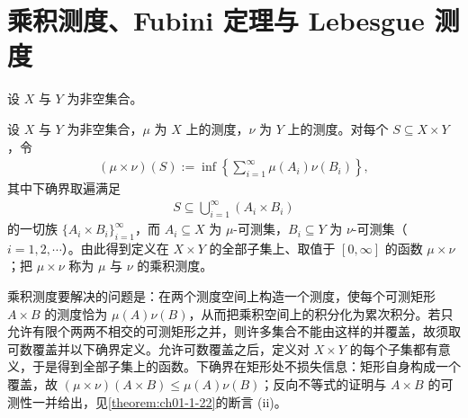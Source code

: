 \documentclass[../../main.tex]{subfiles}%
\begin{document}
\section{乘积测度、Fubini 定理与 Lebesgue 测度}\label{section:ch01-04}

设 $X$ 与 $Y$ 为非空集合。

\begin{definition}[乘积测度]\label{definition:ch01-1-16}
设 $X$ 与 $Y$ 为非空集合，$\mu$ 为 $X$ 上的测度，$\nu$ 为 $Y$ 上的测度。对每个 $S\subseteq X\times Y$，令
\begin{align*}
(\mu\times\nu)(S):=\inf\left\{\sum_{i=1}^{\infty}\mu(A_i)\nu(B_i)\right\},
\end{align*}
其中下确界取遍满足
\begin{align*}
S\subseteq\bigcup_{i=1}^{\infty}(A_i\times B_i)
\end{align*}
的一切族 $\{A_i\times B_i\}_{i=1}^{\infty}$，而 $A_i\subseteq X$ 为 $\mu$-可测集，$B_i\subseteq Y$ 为 $\nu$-可测集（$i=1,2,\cdots$）。由此得到定义在 $X\times Y$ 的全部子集上、取值于 $[0,\infty]$ 的函数 $\mu\times\nu$；把 $\mu\times\nu$ 称为 $\mu$ 与 $\nu$ 的乘积测度。
\end{definition}

\begin{remark}\label{remark:ch01-def-1-16-动机}
乘积测度要解决的问题是：在两个测度空间上构造一个测度，使每个可测矩形 $A\times B$ 的测度恰为 $\mu(A)\nu(B)$，从而把乘积空间上的积分化为累次积分。若只允许有限个两两不相交的可测矩形之并，则许多集合不能由这样的并覆盖，故须取可数覆盖并以下确界定义。允许可数覆盖之后，定义对 $X\times Y$ 的每个子集都有意义，于是得到全部子集上的函数。下确界在矩形处不损失信息：矩形自身构成一个覆盖，故 $(\mu\times\nu)(A\times B)\leqslant\mu(A)\nu(B)$；反向不等式的证明与 $A\times B$ 的可测性一并给出，见\cref{theorem:ch01-1-22}的断言 (ii)。%
\end{remark}
\end{document}
